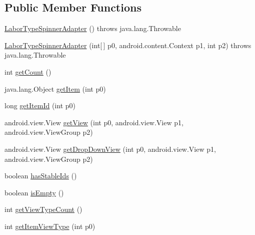 \subsection*{Public Member Functions}
\begin{DoxyCompactItemize}
\item 
\hyperlink{classfieldservice_1_1android_1_1_labor_type_spinner_adapter_a1df4162053eb5c94941a72059f450fae}{Labor\+Type\+Spinner\+Adapter} ()  throws java.\+lang.\+Throwable 	
\item 
\hyperlink{classfieldservice_1_1android_1_1_labor_type_spinner_adapter_ad1dc25ed9d7e91079c33bcc5fc5bb3eb}{Labor\+Type\+Spinner\+Adapter} (int\mbox{[}$\,$\mbox{]} p0, android.\+content.\+Context p1, int p2)  throws java.\+lang.\+Throwable 	
\item 
int \hyperlink{classfieldservice_1_1android_1_1_labor_type_spinner_adapter_a5dd099255e921ba7ae97403e8c21ffa6}{get\+Count} ()
\item 
java.\+lang.\+Object \hyperlink{classfieldservice_1_1android_1_1_labor_type_spinner_adapter_af6b46fd13f6c9a2f9e5365f77ae092df}{get\+Item} (int p0)
\item 
long \hyperlink{classfieldservice_1_1android_1_1_labor_type_spinner_adapter_a9b00a983c7f5255f1c4eb7ba13f57429}{get\+Item\+Id} (int p0)
\item 
android.\+view.\+View \hyperlink{classfieldservice_1_1android_1_1_labor_type_spinner_adapter_a0a757d376ec0e4834809c1095b7ff94b}{get\+View} (int p0, android.\+view.\+View p1, android.\+view.\+View\+Group p2)
\item 
android.\+view.\+View \hyperlink{classfieldservice_1_1android_1_1_labor_type_spinner_adapter_a4c939a5e0c7d811c443b0c83174a727d}{get\+Drop\+Down\+View} (int p0, android.\+view.\+View p1, android.\+view.\+View\+Group p2)
\item 
boolean \hyperlink{classfieldservice_1_1android_1_1_labor_type_spinner_adapter_ab6e566feb6a883db995ff6f29b471989}{has\+Stable\+Ids} ()
\item 
boolean \hyperlink{classfieldservice_1_1android_1_1_labor_type_spinner_adapter_acff20ea2104f3ca3ecb1775124f1ee18}{is\+Empty} ()
\item 
int \hyperlink{classfieldservice_1_1android_1_1_labor_type_spinner_adapter_ab97a22024dc347fd837a7c13fd227f15}{get\+View\+Type\+Count} ()
\item 
int \hyperlink{classfieldservice_1_1android_1_1_labor_type_spinner_adapter_aadbf3ab1a88bddc91797890d996e77c6}{get\+Item\+View\+Type} (int p0)
\item 

\end{DoxyCompactItemize}
